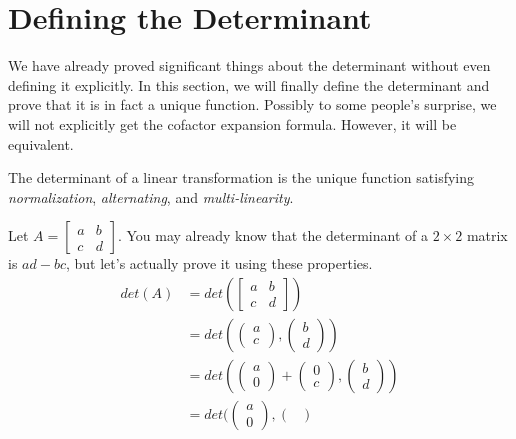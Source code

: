 \section{Defining the Determinant}
We have already proved significant things about the determinant without even defining it explicitly. In this section, we will finally define the determinant and prove that it is in fact a unique function. Possibly to some people's surprise, we will not explicitly get the cofactor expansion formula. However, it will be equivalent.
\begin{definition}
    The determinant of a linear transformation is the unique function satisfying \textit{normalization}, \textit{alternating}, and \textit{multi-linearity}.
\end{definition}
\begin{example}
    Let $A=\begin{bmatrix}
        a & b \\
        c & d
    \end{bmatrix}$. You may already know that the determinant of a $2\times 2$ matrix is $ad-bc$, but let's actually prove it using these properties.
    \begin{align*}
        det(A)&=det(\begin{bmatrix}
        a & b \\
        c & d
    \end{bmatrix})\\
    &=det(\begin{pmatrix}
        a \\ c
    \end{pmatrix}, \begin{pmatrix}
        b \\ d
    \end{pmatrix})\\
    &=det(\begin{pmatrix}
        a \\ 0
    \end{pmatrix}+\begin{pmatrix}
        0 \\ c
    \end{pmatrix}, \begin{pmatrix}
        b \\ d
    \end{pmatrix})\\
    &=det(\begin{pmatrix}
        a \\ 0
    \end{pmatrix}, \begin{pmatrix}

\end{pmatrix}
\end{align*}
\end{example}

